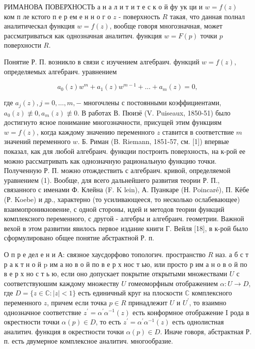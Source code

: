 \documentclass[10pt]{article}
\begin{document}
РИМАНОВА ПОВЕРХНОСТЬ а н а л и т и т е с к о й фу ук ци и $w=f(z) \quad$ ком п ле кстого п е р ем е н н о г о $z$ - поверхность $R$ такая, что данная полнал аналитическал функция $w=f(z)$, вообще говоря многозначная, может рассматриваться как однозначная аналитич. функция $w=F(p)$ точки $p$ поверхности $R$.



Понятие Р. П. возникло в связи с изучением алгебраич. функций $w=f(z)$, определяемых алгебраич. уравнением



\[

a_{0}(z) w^{m}+a_{1}(z) w^{m-1}+\ldots+a_{m}(z)=0,

\]



где $a_{j}(z), j=0, \ldots, m,-$ многочлены с постоянными коэффициентами, $a_{0}(z) \not \equiv 0, a_{m}(z) \not \equiv 0$. В работах В. Пюизё (V. Puiseaux, 1850-51) было достигнуто ясное понимание многозначности, присущей этим функциям $w=f(z)$, когда каждому значению переменного $z$ ставится в соответствие $m$ значений переменного $w$. Б. Риман (B. Riemann, 1851-57, см. [1]) впервые показал, как для любой алгебраич. функции построить поверхность, на к-рой ее можно рассматривать как однозначную рациональную функцию точки. Полученную Р. П. можно отождествить с алгебраич. кривой, определяемой уравнением (1). Вообще, для всего дальнейшего развития теории Р. П., связанного с именами Ф. Клейна (F. K lein), А. Пуанкаре (Н. Poincaré), П. Кёбе (Р. Koebe) и др., характерно (то усиливающееся, то несколько ослабевающее) взаимопроникновение, с одной стороны, идей и методов теории функций комплексного переменного, с другой - алгебры и алгебраич. геометрии. Важной вехой в этом развитии явилось первое издание книги Г. Вейля [18], в к-рой было сформулировано общее понятие абстрактной Р. п.



О п р е дел е н и А: связное хаусдорфово топологич. пространство $R$ наз. а б с т р а к т н о й $\mathrm{p}$ им а но в о й по в е р х нос т ью, или просто р им а н о в о й по в е р х но с т ь ю, если оно допускает покрытие открытыми множествами $U$ с соответствуюшим каждому множеству $U$ гомеоморфным отображением $\alpha: U \rightarrow D$, где $D=\{z \in \mathbb{C}:|z|<1\}$ есть единичный круг на плоскости $\mathbb{C}$ комплексного переменного $z$, причем если точка $p \in R$ принадлежит $U$ и $U^{\prime}$, то взаимно однозначное соответствие $z^{\prime}=\alpha^{\prime} \alpha^{-1}(z)$ есть конформное отображение I рода в окрестности точки $\alpha(p) \in D$, то есть $z^{\prime}=\alpha^{\prime} \alpha^{-1}(z)$ есть однолистная аналитич. функция в окрестности точки $\alpha(p) \in D$. Иначе говоря, абстрактная Р. п. есть двумерное комплексное аналитич. многообразие.
\end{document}
